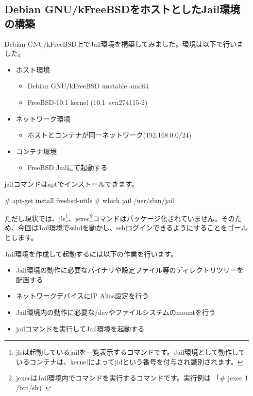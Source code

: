 \documentclass[mingoth,a4paper]{jsarticle}
\begin{document}
\subsection{Debian GNU/kFreeBSDをホストとしたJail環境の構築}

Debian GNU/kFreeBSD上でJail環境を構築してみました。環境は以下で行いました。

\begin{itemize}
  \item ホスト環境 
  \begin{itemize}
    \item Debian GNU/kFreeBSD unstable amd64
    \item FreeBSD-10.1 kernel (10.1~svn274115-2)
  \end{itemize}
  \item ネットワーク環境 
  \begin{itemize}
    \item ホストとコンテナが同一ネットワーク(192.168.0.0/24)
  \end{itemize}
  \item コンテナ環境
  \begin{itemize}
    \item FreeBSD Jailにて起動する
  \end{itemize}
\end{itemize}

jailコマンドはaptでインストールできます。

\begin{commandline}
# apt-get install freebsd-utils
# which jail
/usr/sbin/jail
\end{commandline}

ただし現状では、jls\footnote{jlsは起動しているjailを一覧表示するコマンドです。Jail環境として動作しているコンテナは、kernelによってjidという番号を付与され識別されます。}、jexec\footnote{jexecはJail環境内でコマンドを実行するコマンドです。実行例は 「\# jexec 1 /bin/sh」}コマンドはパッケージ化されていません。そのため、今回はJail環境でsshdを動かし、sshログインできるようにすることをゴールとします。

Jail環境を作成して起動するには以下の作業を行います。

\begin{itemize}
  \item Jail環境の動作に必要なバイナリや設定ファイル等のディレクトリツリーを配置する
  \item ネットワークデバイスにIP Alias設定を行う
  \item Jail環境内の動作に必要な/devやファイルシステムのmountを行う
  \item jailコマンドを実行してJail環境を起動する
\end{itemize}
\end{document}
